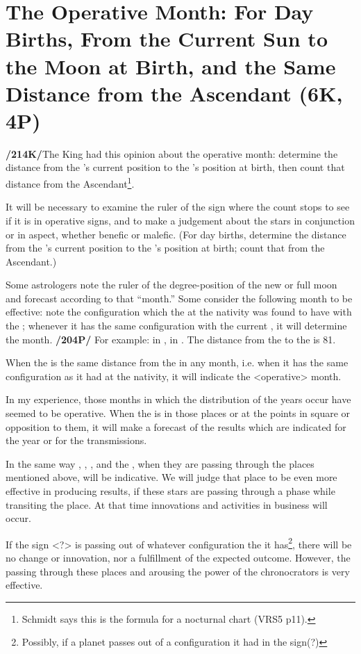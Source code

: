 \section{The Operative Month: For Day Births, From the Current Sun to the Moon at Birth, and the Same Distance from the Ascendant (6K, 4P)}

\textbf{/214K/}The King had this opinion about the operative month: determine the distance from the \Sun’s current position to the \Moon’s position at birth, then count that distance from the Ascendant\footnote{Schmidt says this is the formula for a nocturnal chart (VRS5 p11).}. 

It will be necessary to examine the ruler of the sign where the count stops to see if it is in operative signs, and to make a judgement about the stars in conjunction or in aspect, whether benefic or malefic. (For day births, determine the distance from the \Moon’s current position to the \Sun’s position at birth; count that from the Ascendant.)

Some astrologers note the ruler of the degree-position of the new or full moon and forecast according to that “month.” Some consider the following month to be effective: note the configuration which the \Moon\xspace at the nativity was found to have with the \Sun; whenever it has the same configuration with the current \Sun,
it will determine the month. \textbf{/204P/} For example: \Sun\xspace in \Leo\xspace 5\deg, \Moon\xspace in \Libra\xspace 2\deg. The distance from
the \Sun\xspace to the \Moon\xspace is 81\deg. 

When the \Moon\xspace is the same distance from the \Sun\xspace in any month, i.e. when it has the same configuration as it had at the nativity, it will indicate the <operative> month.

In my experience, those months in which the distribution of the years occur have seemed to be operative. When the \Sun\xspace is in those places or at the points in square or opposition to them, it will make a
forecast of the results which are indicated for the year or for the transmissions. 

In the same way \Mars, \Venus, \Mercury, and the \Moon, when they are passing through the places mentioned above, will be indicative. We will judge that place to be even more effective in producing results, if these stars are passing through a phase while transiting the place. At that time innovations and activities in business will occur. 

If the sign <?> is passing out of whatever configuration the it has\footnote{Possibly, if a planet passes out of a configuration it had in the sign(?)}, there will be no change or innovation, nor a fulfillment of the expected outcome. However, the \Sun\xspace passing through these places and
arousing the power of the chronocrators is very effective.



\newpage